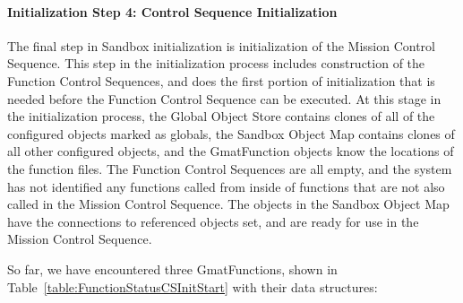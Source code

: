 \paragraph{Initialization Step 4: Control Sequence Initialization}  The final step in Sandbox
initialization is initialization of the Mission Control Sequence.  This step in the initialization
process includes construction of the Function Control Sequences, and does the first portion of
initialization that is needed before the Function Control Sequence can be executed.  At this stage
in the initialization process, the Global Object Store contains clones of all of the configured
objects marked as globals, the Sandbox Object Map contains clones of all other configured objects,
and the GmatFunction objects know the locations of the function files.  The Function Control
Sequences are all empty, and the system has not identified any functions called from inside of
functions that are not also called in the Mission Control Sequence. The objects in the Sandbox
Object Map have the connections to referenced objects set, and are ready for use in the Mission
Control Sequence.

So far, we have encountered three GmatFunctions, shown in
Table~\ref{table:FunctionStatusCSInitStart} with their data structures:


